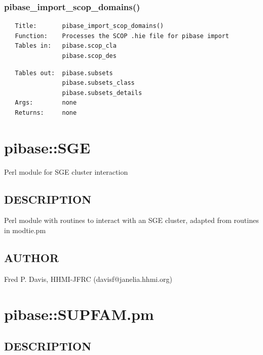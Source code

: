 \documentclass{article}
\begin{document}
\subsubsection*{pibase\_import\_scop\_domains()\label{pibase::SCOP_pibase_import_scop_domains_}}
\begin{verbatim}
   Title:       pibase_import_scop_domains()
   Function:    Processes the SCOP .hie file for pibase import
   Tables in:   pibase.scop_cla
                pibase.scop_des
\end{verbatim}
\begin{verbatim}
   Tables out:  pibase.subsets
                pibase.subsets_class
                pibase.subsets_details
   Args:        none
   Returns:     none
\end{verbatim}
\clearpage
\section{pibase::SGE\label{pibase::SGE}}


Perl module for SGE cluster interaction

\subsection*{DESCRIPTION\label{pibase::SGE_DESCRIPTION}}


Perl module with routines to interact with an SGE cluster,
adapted from routines in modtie.pm

\subsection*{AUTHOR\label{pibase::SGE_AUTHOR}}


Fred P. Davis, HHMI-JFRC (davisf@janelia.hhmi.org)

\clearpage
\section{pibase::SUPFAM.pm\label{pibase::SUPFAM_pm}}




\subsection*{DESCRIPTION\label{pibase::SUPFAM_pm_DESCRIPTION}}
\end{document}
